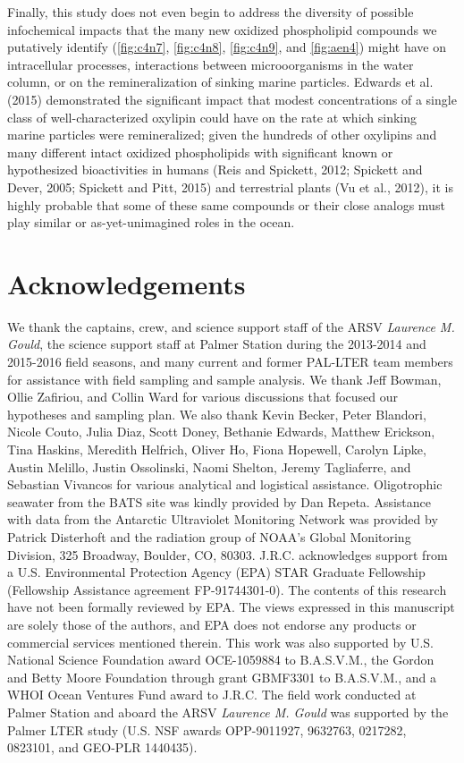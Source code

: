 Finally, this study does not even begin to address the diversity of possible infochemical impacts that the many new oxidized phospholipid compounds we putatively identify (\autoref{fig:c4n7}, \autoref{fig:c4n8}, \autoref{fig:c4n9}, and \autoref{fig:aen4}) might have on intracellular processes, interactions between microoorganisms in the water column, or on the remineralization of sinking marine particles. Edwards et al. (2015) demonstrated the significant impact that modest concentrations of a single class of well-characterized oxylipin could have on the rate at which sinking marine particles were remineralized; given the hundreds of other oxylipins and many different intact oxidized phospholipids with significant known or hypothesized bioactivities in humans (Reis and Spickett, 2012; Spickett and Dever, 2005; Spickett and Pitt, 2015) and terrestrial plants (Vu et al., 2012), it is highly probable that some of these same compounds or their close analogs must play similar or as-yet-unimagined roles in the ocean.

\section{Acknowledgements}

We thank the captains, crew, and science support staff of the ARSV \emph{Laurence M. Gould}, the science support staff at Palmer Station during the 2013-2014 and 2015-2016 field seasons, and many current and former PAL-LTER team members for assistance with field sampling and sample analysis. We thank Jeff Bowman, Ollie Zafiriou, and Collin Ward for various discussions that focused our hypotheses and sampling plan. We also thank Kevin Becker, Peter Blandori, Nicole Couto, Julia Diaz, Scott Doney, Bethanie Edwards, Matthew Erickson, Tina Haskins, Meredith Helfrich, Oliver Ho, Fiona Hopewell, Carolyn Lipke, Austin Melillo, Justin Ossolinski, Naomi Shelton, Jeremy Tagliaferre, and Sebastian Vivancos for various analytical and logistical assistance. Oligotrophic seawater from the BATS site was kindly provided by Dan Repeta. Assistance with data from the Antarctic Ultraviolet Monitoring Network was provided by Patrick Disterhoft and the radiation group of NOAA's Global Monitoring Division, 325 Broadway, Boulder, CO, 80303. J.R.C. acknowledges support from a U.S. Environmental Protection Agency (EPA) STAR Graduate Fellowship (Fellowship Assistance agreement FP-91744301-0). The contents of this research have not been formally reviewed by EPA. The views expressed in this manuscript are solely those of the authors, and EPA does not endorse any products or commercial services mentioned therein. This work was also supported by U.S. National Science Foundation award OCE-1059884 to B.A.S.V.M., the Gordon and Betty Moore Foundation through grant GBMF3301 to B.A.S.V.M., and a WHOI Ocean Ventures Fund award to J.R.C. The field work conducted at Palmer Station and aboard the ARSV \emph{Laurence M. Gould} was supported by the Palmer LTER study (U.S. NSF awards OPP-9011927, 9632763, 0217282, 0823101, and GEO-PLR 1440435).

